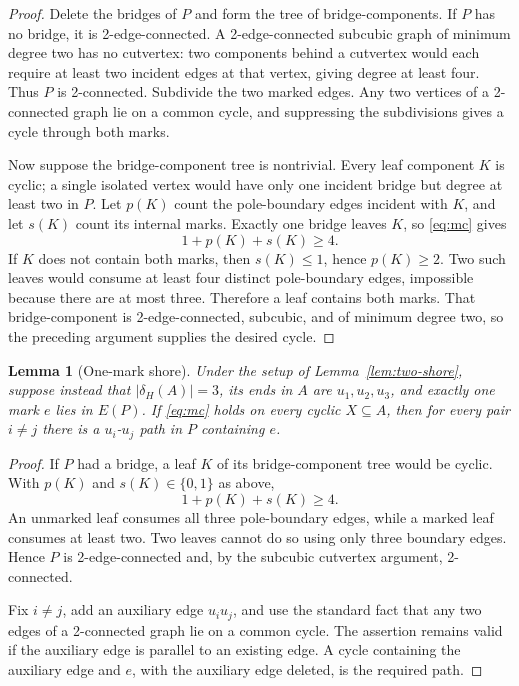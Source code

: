 \documentclass[11pt]{article}
\newtheorem{lemma}[theorem]{Lemma}
\theoremstyle{definition}
\theoremstyle{remark}
\begin{document}
\begin{proof}
Delete the bridges of \(P\) and form the tree of bridge-components.  If
\(P\) has no bridge, it is 2-edge-connected.  A 2-edge-connected
subcubic graph of minimum degree two has no cutvertex: two components
behind a cutvertex would each require at least two incident edges at
that vertex, giving degree at least four.  Thus \(P\) is 2-connected.
Subdivide the two marked edges.  Any two vertices of a 2-connected graph
lie on a common cycle, and suppressing the subdivisions gives a cycle
through both marks.

Now suppose the bridge-component tree is nontrivial.  Every leaf
component \(K\) is cyclic; a single isolated vertex would have only one
incident bridge but degree at least two in \(P\).  Let \(p(K)\) count
the pole-boundary edges incident with \(K\), and let \(s(K)\) count its
internal marks.  Exactly one bridge leaves \(K\), so \eqref{eq:mc} gives
\[
  1+p(K)+s(K)\geq4.
\]
If \(K\) does not contain both marks, then \(s(K)\leq1\), hence
\(p(K)\geq2\).  Two such leaves would consume at least four distinct
pole-boundary edges, impossible because there are at most three.
Therefore a leaf contains both marks.  That bridge-component is
2-edge-connected, subcubic, and of minimum degree two, so the preceding
argument supplies the desired cycle.
\end{proof}

\begin{lemma}[One-mark shore]\label{lem:one-shore}
Under the setup of Lemma~\ref{lem:two-shore}, suppose instead that
\(|\delta_H(A)|=3\), its ends in \(A\) are \(u_1,u_2,u_3\), and exactly
one mark \(e\) lies in \(E(P)\).  If \eqref{eq:mc} holds on every cyclic
\(X\subseteq A\), then for every pair \(i\neq j\) there is a
\(u_i\)-\(u_j\) path in \(P\) containing \(e\).
\end{lemma}

\begin{proof}
If \(P\) had a bridge, a leaf \(K\) of its bridge-component tree would
be cyclic.  With \(p(K)\) and \(s(K)\in\{0,1\}\) as above,
\[
  1+p(K)+s(K)\geq4.
\]
An unmarked leaf consumes all three pole-boundary edges, while a marked
leaf consumes at least two.  Two leaves cannot do so using only three
boundary edges.  Hence \(P\) is 2-edge-connected and, by the subcubic
cutvertex argument, 2-connected.

Fix \(i\neq j\), add an auxiliary edge \(u_i u_j\), and use the standard
fact that any two edges of a 2-connected graph lie on a common cycle.
The assertion remains valid if the auxiliary edge is parallel to an
existing edge.  A cycle containing the auxiliary edge and \(e\), with
the auxiliary edge deleted, is the required path.
\end{proof}
\end{document}
